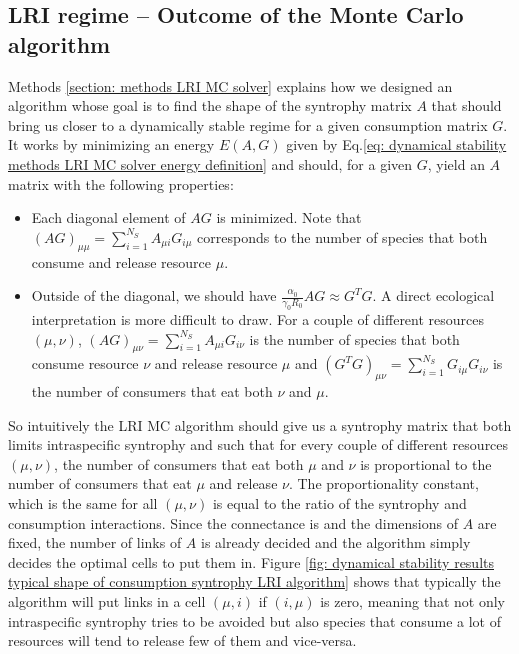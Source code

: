 \documentclass[12pt, titlepage]{report}
\begin{document}
\subsection{LRI regime -- Outcome of the Monte Carlo algorithm}
Methods \ref{section: methods LRI MC solver} explains how we designed an algorithm whose goal is to find the shape of the syntrophy matrix $A$ that should bring us closer to a dynamically stable regime for a given consumption matrix $G$. It works by minimizing an energy $E(A,G)$ given by Eq.\eqref{eq: dynamical stability methods LRI MC solver energy definition} and should, for a given $G$, yield an $A$ matrix with the following properties:
\begin{itemize}
\item Each diagonal element of $AG$ is minimized. Note that $(AG)_{\mu\mu}=\sum_{i=1}^{N_S} A_{\mu i} G_{i\mu}$ corresponds to the number of species that both consume and release resource $\mu$.
\item Outside of the diagonal, we should have $\frac{\alpha_0}{\gamma_0 R_0} AG \approx  G^T G$. A direct ecological interpretation is more difficult to draw. For a couple of different resources $(\mu,\nu)$,  $(AG)_{\mu\nu}=\sum_{i=1}^{N_S} A_{\mu i} G_{i\nu}$ is the number of species that both consume resource $\nu$ and release resource $\mu$ and $(G^TG)_{\mu\nu}=\sum_{i=1}^{N_S} G_{i\mu}G_{i\nu}$ is the number of consumers that eat both $\nu$ and $\mu$.
\end{itemize}
So intuitively the LRI MC algorithm should give us a syntrophy matrix that both limits intraspecific syntrophy and such that for every couple of different resources $(\mu, \nu)$, the number of consumers that eat both $\mu$ and $\nu$ is proportional to the number of consumers that eat $\mu$ and release $\nu$. The proportionality constant, which is the same for all $(\mu, \nu)$ is equal to the ratio of the syntrophy and consumption interactions.
 Since the connectance is and the dimensions of $A$ are fixed, the number of links of $A$ is already decided and the algorithm simply decides the optimal cells to put them in. Figure \ref{fig: dynamical stability results typical shape of consumption syntrophy LRI algorithm} shows that typically the algorithm will put links in a cell $(\mu,i)$ if $(i, \mu)$ is zero, meaning that not only intraspecific syntrophy tries to be avoided but also species that consume a lot of resources will tend to release few of them and vice-versa.
\end{document}
